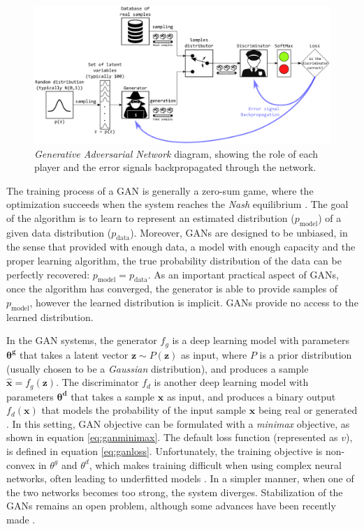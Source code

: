 \begin{figure}[h]
	\centering
	\includegraphics[width=1\textwidth]{chapter2/images/police_counterfeiter.eps}
	\caption{\textit{Generative Adversarial Network} diagram, showing the role of each player and the error signals backpropagated through the network.}
	\label{fig:police_counterfeiter}
\end{figure}

The training process of a GAN is generally a zero-sum game, where the optimization succeeds when the system reaches the \textit{Nash} equilibrium \autocite{nash48}. The goal of the algorithm is to learn to represent an estimated distribution ($p_{\mathrm{model}}$) of a given data distribution ($p_{\mathrm{data}}$). Moreover, GANs are designed to be unbiased, in the sense that provided with enough data, a model with enough capacity and the proper learning algorithm, the true probability distribution of the data can be perfectly recovered: $p_{\mathrm{model}} = p_{\mathrm{data}}$. As an important practical aspect of GANs, once the algorithm has converged, the generator is able to provide samples of $p_\mathrm{model}$, however the learned distribution is implicit. GANs provide no access to the learned distribution.

In the GAN systems, the generator $f_g$ is a deep learning model with parameters $\mathbf{\theta^g}$ that takes a latent vector $\mathbf{z} \sim P(\mathbf{z})$ as input, where $P$ is a prior distribution (usually chosen to be a \textit{Gaussian} distribution), and produces a sample $\hat{\mathbf{x}}=f_g(\mathbf{z})$. The discriminator $f_d$ is another deep learning model with parameters $\mathbf{\theta^d}$ that takes a sample $\mathbf{x}$ as input, and produces a binary output $f_d(\mathbf{x})$ that models the probability of the input sample $\mathbf{x}$ being real or generated \autocite{Goodfellow2014}. In this setting, GAN objective can be formulated with a \textit{minimax} objective, as shown in equation \ref{eq:ganminimax}. The default loss function (represented as $v$), is defined in equation \ref{eq:ganloss}. Unfortunately, the training objective is non-convex in $\theta^g$ and $\theta^d$, which makes training difficult when using complex neural networks, often leading to underfitted models \autocite{Goodfellow2016b,Goodfellow2016}. In a simpler manner, when one of the two networks becomes too strong, the system diverges. Stabilization of the GANs remains an open problem, although some advances have been recently made \autocite{arjovsky2017, shaobo2017, wang2022}.

